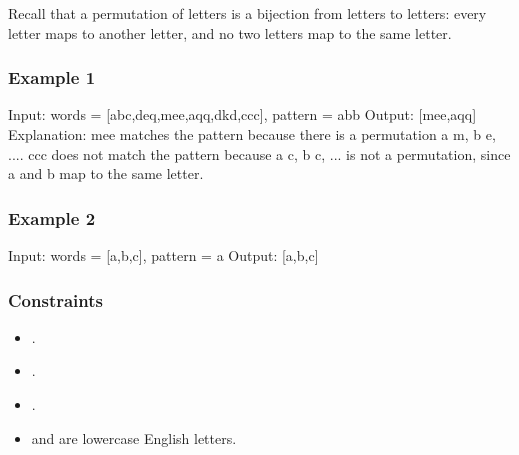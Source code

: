 \documentclass[letterpaper,12pt,english]{book}
\begin{document}
\sphinxAtStartPar
Recall that a permutation of letters is a bijection from letters to letters: every letter maps to another letter, and no two letters map to the same letter.


\subsubsection{Example 1}
\label{\detokenize{String/08_STR_890_Find_and_Replace_Pattern:example-1}}
\begin{sphinxVerbatim}[commandchars=\\\{\}]
Input: words = [\PYGZdq{}abc\PYGZdq{},\PYGZdq{}deq\PYGZdq{},\PYGZdq{}mee\PYGZdq{},\PYGZdq{}aqq\PYGZdq{},\PYGZdq{}dkd\PYGZdq{},\PYGZdq{}ccc\PYGZdq{}], pattern = \PYGZdq{}abb\PYGZdq{}
Output: [\PYGZdq{}mee\PYGZdq{},\PYGZdq{}aqq\PYGZdq{}]
Explanation: \PYGZdq{}mee\PYGZdq{} matches the pattern because there is a permutation \PYGZob{}a \PYGZhy{}\PYGZgt{} m, b \PYGZhy{}\PYGZgt{} e, ...\PYGZcb{}. 
\PYGZdq{}ccc\PYGZdq{} does not match the pattern because \PYGZob{}a \PYGZhy{}\PYGZgt{} c, b \PYGZhy{}\PYGZgt{} c, ...\PYGZcb{} is not a permutation, since a and b map to the same letter.
\end{sphinxVerbatim}


\subsubsection{Example 2}
\label{\detokenize{String/08_STR_890_Find_and_Replace_Pattern:example-2}}
\begin{sphinxVerbatim}[commandchars=\\\{\}]
Input: words = [\PYGZdq{}a\PYGZdq{},\PYGZdq{}b\PYGZdq{},\PYGZdq{}c\PYGZdq{}], pattern = \PYGZdq{}a\PYGZdq{}
Output: [\PYGZdq{}a\PYGZdq{},\PYGZdq{}b\PYGZdq{},\PYGZdq{}c\PYGZdq{}]
\end{sphinxVerbatim}


\subsubsection{Constraints}
\label{\detokenize{String/08_STR_890_Find_and_Replace_Pattern:constraints}}\begin{itemize}
\item {} 
\sphinxAtStartPar
{}.

\item {} 
\sphinxAtStartPar
{}.

\item {} 
\sphinxAtStartPar
{}.

\item {} 
\sphinxAtStartPar
{} and  are lowercase English letters.

\end{itemize}
\end{document}
